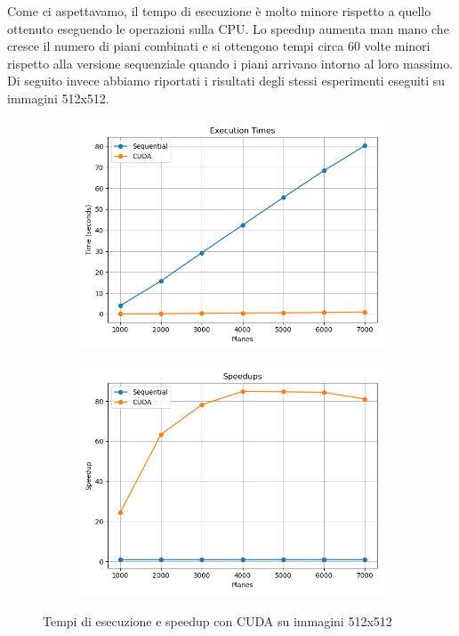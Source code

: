 Come ci aspettavamo, il tempo di esecuzione è molto minore rispetto a quello ottenuto eseguendo le operazioni sulla CPU.
Lo speedup aumenta man mano che cresce il numero di piani combinati e si ottengono tempi circa 60 volte minori rispetto alla versione sequenziale quando i piani arrivano intorno al loro massimo. \\

Di seguito invece abbiamo riportati i risultati degli stessi esperimenti eseguiti su immagini 512x512.
\begin{figure}[H]
    \centering
    \begin{subfigure}{0.49\textwidth}
        \centering
        \includegraphics[width=\textwidth]{../results/plots/512/cuda_times}
    \end{subfigure}
    \begin{subfigure}{0.49\textwidth}
        \centering
        \includegraphics[width=\textwidth]{../results/plots/512/cuda_speedup}
    \end{subfigure}
    \caption{Tempi di esecuzione e speedup con CUDA su immagini 512x512}
    \label{fig:cuda_512}
\end{figure}
